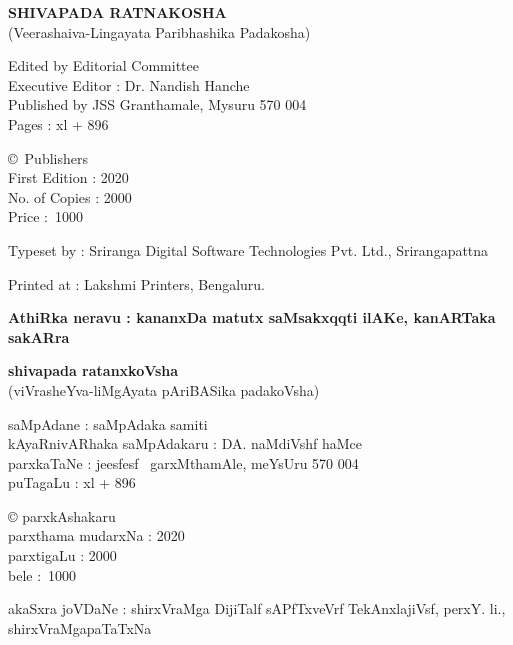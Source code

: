 \thispagestyle{empty}
\noindent
{\rm\sf\bfseries SHIVAPADA RATNAKOSHA}\\[5pt]
{\rm (Veerashaiva-Lingayata Paribhashika Padakosha)} 

\noindent
{\rm Edited by Editorial Committee}\\
{\rm Executive Editor : Dr. Nandish Hanche}\\
{\rm Published by JSS Granthamale, Mysuru 570 004}\\[8pt]
{\rm Pages : xl + 896}

\vspace{1cm}

\noindent
{\rm \copyright \ Publishers}\\[7pt]
{\rm First Edition : 2020}\\[7pt]
{\rm No. of Copies : 2000}\\[7pt]
{\rm Price : \rupee\,1000}

\bigskip

\noindent
{\rm Typeset by : Sriranga Digital Software Technologies Pvt. Ltd., Srirangapattna}

\medskip

\noindent
{\rm Printed at : Lakshmi Printers, Bengaluru.}

\vfill

\noindent
{\bf AthiRka neravu : kananxDa matutx saMsakxqqti ilAKe, kanARTaka sakARra}

\vskip 1cm

\noindent
{\bf\large shivapada ratanxkoVsha}\\[5pt]
(viVrasheYva-liMgAyata pAriBASika padakoVsha) 

\smallskip

\noindent
saMpAdane : saMpAdaka samiti\\
kAyaRnivARhaka saMpAdakaru : DA. naMdiVshf haMce\\
parxkaTaNe : je{esf}{esf} \ garxMthamAle, meYsUru 570 004\\[8pt]
puTagaLu : {\rm xl} + 896

\vspace{1cm}

\noindent
{\rm \copyright} parxkAshakaru\\[7pt]
parxthama mudarxNa : 2020\\[7pt]
parxtigaLu : 2000\\[10pt]
bele : \rupee\,1000

\bigskip

\noindent
akaSxra joVDaNe : shirxVraMga DijiTalf sAPfTxveVrf TekAnxlajiVsf, perxY. li., shirxVraMgapaTaTxNa

